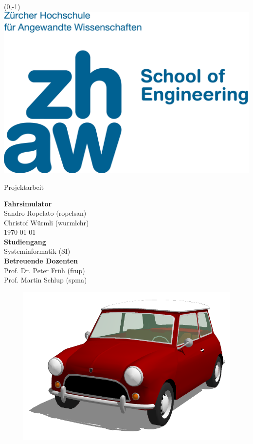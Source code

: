 %
%


\begin{titlepage}
\cleardoublepage

\begin{textblock}{10}(0,-1)
\includegraphics[width=0.3\linewidth]{src/ZHAWlogo2.pdf}
\end{textblock}

\center

\Large{\textsf{Projektarbeit}}
\vspace{2em}

\Huge{\textsf{\textbf{Fahrsimulator}}}
\vspace{2em}
\\
\Large{
	\textsf{
		Sandro Ropelato (ropelsan)\\
		Christof Würmli (wurmlchr)\\
		\vspace{2em}
		\today\\
		\vspace{2em}
		\textbf{Studiengang}\\
		Systeminformatik (SI)\\
		\vspace{3em}
		\textbf{Betreuende Dozenten}\\
		Prof. Dr. Peter Früh (frup)\\
		Prof. Martin Schlup (spma)	
	}
}\\

\vspace{4em}

\begin{figure}[htbp]
\centering 
\includegraphics[width=0.5\linewidth]{src/MiniCooper.png}
\end{figure}

\end{titlepage}
